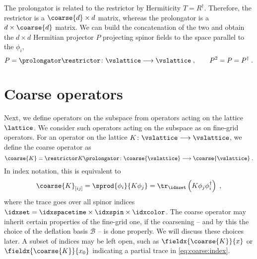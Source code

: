 The prolongator is related to the restrictor by Hermiticity $T = R^{\dagger}$.
Therefore, the restrictor is a $\coarse{d} \times d$ matrix, whereas the prolongator is a $d \times \coarse{d}$ matrix.
We can build the concatenation of the two and obtain the $d \times d$ Hermitian projector $P$ projecting spinor fields to the space parallel to the $\phi_{i}$,
\begin{equation} \label{eq:P}
P = \prolongator \restrictor \colon \vslattice \longrightarrow \vslattice \;,
\qquad
P^{2} = P = P^{\dagger} \;.
\end{equation}

\section{Coarse operators}

Next, we define operators on the subspace from operators acting on the lattice $\lattice$.
We consider such operators acting on the subspace as  on fine-grid operators.
For an operator on the lattice $K \colon \vslattice \longrightarrow \vslattice$, we define the coarse operator as
\begin{equation} \label{eq:sd:coarse:op}
\coarse{K} = \restrictor K \prolongator \colon \coarse{\vslattice} \longrightarrow \coarse{\vslattice} \;.
\end{equation}
In index notation, this is equivalent to
\begin{equation} \label{eq:coarse:index}
\coarse{K}_{[i j]} =
\sprod{ \phi_{i} }{ K \phi_{j} } =
\tr_{\idxset} \left( K \phi_j \phi_i^\dagger \right) \;,
\end{equation}
where the trace goes over all spinor indices $\idxset = \idxspacetime \times \idxspin \times \idxcolor$.
The coarse operator may inherit certain properties of the fine-grid one, if the coarsening -- and by this the choice of the deflation basis $\mathcal{B}$ --  is done properly.
We will discuss these choices later.
A subset of indices may be left open, such as $\fieldx{\coarse{K}}{x}$ or $\fieldx{\coarse{K}}{x_0}$ indicating a partial trace in \cref{eq:coarse:index}.

